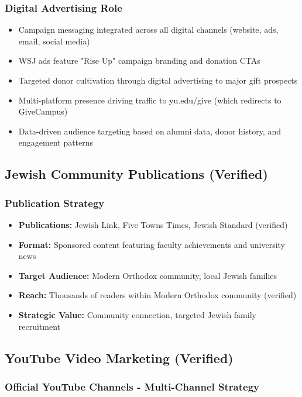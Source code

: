 \documentclass[12pt,letterpaper]{article}
\begin{document}
\subsubsection{Digital Advertising Role}
\begin{itemize}[leftmargin=*]
    \item Campaign messaging integrated across all digital channels (website, ads, email, social media)
    \item WSJ ads feature "Rise Up" campaign branding and donation CTAs
    \item Targeted donor cultivation through digital advertising to major gift prospects
    \item Multi-platform presence driving traffic to yu.edu/give (which redirects to GiveCampus)
    \item Data-driven audience targeting based on alumni data, donor history, and engagement patterns
\end{itemize}

\subsection{Jewish Community Publications (Verified)}

\subsubsection{Publication Strategy}
\begin{itemize}[leftmargin=*]
    \item \textbf{Publications:} Jewish Link, Five Towns Times, Jewish Standard (verified)
    \item \textbf{Format:} Sponsored content featuring faculty achievements and university news
    \item \textbf{Target Audience:} Modern Orthodox community, local Jewish families
    \item \textbf{Reach:} Thousands of readers within Modern Orthodox community (verified)
    \item \textbf{Strategic Value:} Community connection, targeted Jewish family recruitment
\end{itemize}

\subsection{YouTube Video Marketing (Verified)}

\subsubsection{Official YouTube Channels - Multi-Channel Strategy}
\end{document}
